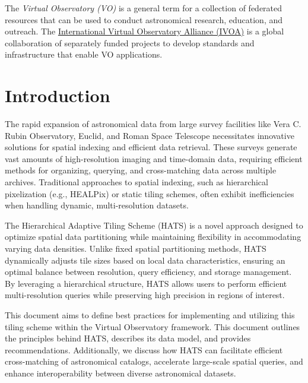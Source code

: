 \documentclass[11pt,a4paper]{ivoa}
\begin{document}
The \emph{Virtual Observatory (VO)} is a
general term for a collection of federated resources that can be used
to conduct astronomical research, education, and outreach.
The \href{https://www.ivoa.net}{International
Virtual Observatory Alliance (IVOA)} is a global
collaboration of separately funded projects to develop standards and
infrastructure that enable VO applications.

\section{Introduction}
The rapid expansion of astronomical data from large survey facilities like Vera C. Rubin Observatory, Euclid, and Roman Space Telescope necessitates innovative solutions for spatial indexing and efficient data retrieval. 
These surveys generate vast amounts of high-resolution imaging and time-domain data, requiring efficient methods for organizing, querying, and cross-matching data across multiple archives. 
Traditional approaches to spatial indexing, such as hierarchical pixelization (e.g., HEALPix) or static tiling schemes, often exhibit inefficiencies when handling dynamic, multi-resolution datasets.

The Hierarchical Adaptive Tiling Scheme (HATS) is a novel approach designed to optimize spatial data partitioning while maintaining flexibility in accommodating varying data densities. 
Unlike fixed spatial partitioning methods, HATS dynamically adjusts tile sizes based on local data characteristics, ensuring an optimal balance between resolution, query efficiency, and storage management. 
By leveraging a hierarchical structure, HATS allows users to perform efficient multi-resolution queries while preserving high precision in regions of interest.

This document aims to define best practices for implementing and utilizing this tiling scheme within the Virtual Observatory framework. 
This document outlines the principles behind HATS, describes its data model, and provides recommendations. 
Additionally, we discuss how HATS can facilitate efficient cross-matching of astronomical catalogs, accelerate large-scale spatial queries, and enhance interoperability between diverse astronomical datasets.
\end{document}
